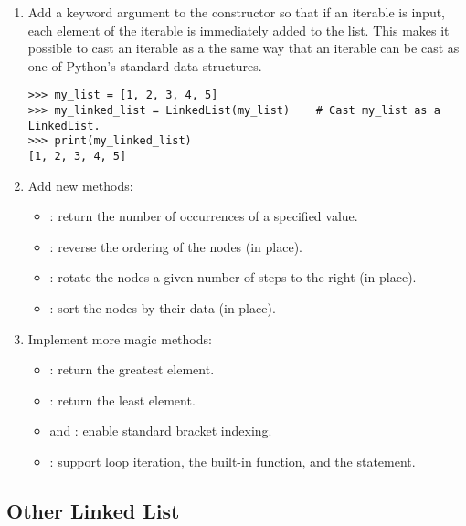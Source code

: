 \begin{enumerate}
\item Add a keyword argument to the constructor so that if an iterable is input, each element of the iterable is immediately added to the list.
This makes it possible to cast an iterable as a  the same way that an iterable can be cast as one of Python's standard data structures.

\begin{lstlisting}
>>> my_list = [1, 2, 3, 4, 5]
>>> my_linked_list = LinkedList(my_list)    # Cast my_list as a LinkedList.
>>> print(my_linked_list)
[1, 2, 3, 4, 5]
\end{lstlisting}

\item Add new methods:
\begin{itemize}
\item {}: return the number of occurrences of a specified value.
\item {}: reverse the ordering of the nodes (in place).
\item {}: rotate the nodes a given number of steps to the right (in place).
\item {}: sort the nodes by their data (in place).
\end{itemize}

\item Implement more magic methods:
\begin{itemize}
\item {}: return the greatest element.
\item {}: return the least element.
\item {} and : enable standard bracket indexing.
\item {}: support  loop iteration, the  built-in function, and the  statement.
\end{itemize}
\end{enumerate}

\subsection*{Other Linked List} %

